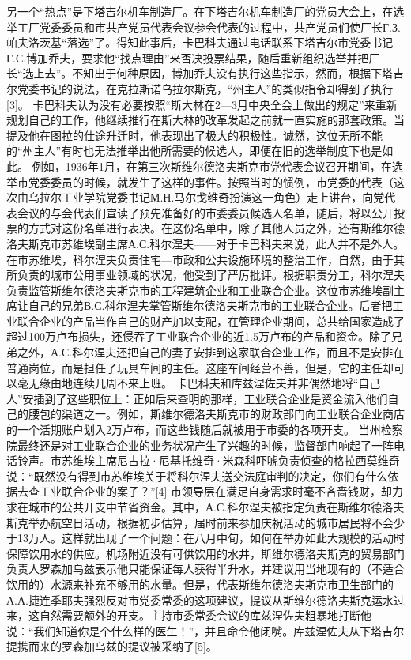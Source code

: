 另一个“热点”是下塔吉尔机车制造厂。在下塔吉尔机车制造厂的党员大会上，在选举工厂党委委员和市共产党员代表会议参会代表的过程中，共产党员们使厂长Г.З.帕夫洛茨基“落选”了。得知此事后，卡巴科夫通过电话联系下塔吉尔市党委书记Г.С.博加乔夫，要求他“找点理由”来否决投票结果，随后重新组织选举并把厂长“选上去”。不知出于何种原因，博加乔夫没有执行这些指示，然而，根据下塔吉尔党委书记的说法，在克拉斯诺乌拉尔斯克，“州主人”的类似指令却得到了执行[3]。
卡巴科夫认为没有必要按照“斯大林在2—3月中央全会上做出的规定”来重新规划自己的工作，他继续推行在斯大林的改革发起之前就一直实施的那套政策。当提及他在图拉的仕途升迁时，他表现出了极大的积极性。诚然，这位无所不能的“州主人”有时也无法推举出他所需要的候选人，即便在旧的选举制度下也是如此。
例如，1936年1月，在第三次斯维尔德洛夫斯克市党代表会议召开期间，在选举市党委委员的时候，就发生了这样的事件。按照当时的惯例，市党委的代表（这次由乌拉尔工业学院党委书记М.Н.马尔戈维奇扮演这一角色）走上讲台，向党代表会议的与会代表们宣读了预先准备好的市委委员候选人名单，随后，将以公开投票的方式对这份名单进行表决。在这份名单中，除了其他人员之外，还有斯维尔德洛夫斯克市苏维埃副主席А.С.科尔涅夫——对于卡巴科夫来说，此人并不是外人。在市苏维埃，科尔涅夫负责住宅—市政和公共设施环境的整治工作，自然，由于其所负责的城市公用事业领域的状况，他受到了严厉批评。根据职责分工，科尔涅夫负责监管斯维尔德洛夫斯克市的工程建筑企业和工业联合企业。这位市苏维埃副主席让自己的兄弟В.С.科尔涅夫掌管斯维尔德洛夫斯克市的工业联合企业。后者把工业联合企业的产品当作自己的财产加以支配，在管理企业期间，总共给国家造成了超过100万卢布损失，还侵吞了工业联合企业的近1.5万卢布的产品和资金。除了兄弟之外，А.С.科尔涅夫还把自己的妻子安排到这家联合企业工作，而且不是安排在普通岗位，而是担任了玩具车间的主任。这座车间经营不善，但是，它的主任却可以毫无缘由地连续几周不来上班。
卡巴科夫和库兹涅佐夫并非偶然地将“自己人”安插到了这些职位上：正如后来查明的那样，工业联合企业是资金流入他们自己的腰包的渠道之一。例如，斯维尔德洛夫斯克市的财政部门向工业联合企业商店的一个活期账户划入2万卢布，而这些钱随后就被用于市委的各项开支。
当州检察院最终还是对工业联合企业的业务状况产生了兴趣的时候，监督部门响起了一阵电话铃声。市苏维埃主席尼古拉·尼基托维奇·米森科吓唬负责侦查的格拉西莫维奇说：“既然没有得到市苏维埃关于将科尔涅夫送交法庭审判的决定，你们有什么依据去查工业联合企业的案子？”[4]
市领导层在满足自身需求时毫不吝啬钱财，却力求在城市的公共开支中节省资金。其中，А.С.科尔涅夫被指定负责在斯维尔德洛夫斯克举办航空日活动，根据初步估算，届时前来参加庆祝活动的城市居民将不会少于13万人。这样就出现了一个问题：在八月中旬，如何在举办如此大规模的活动时保障饮用水的供应。机场附近没有可供饮用的水井，斯维尔德洛夫斯克的贸易部门负责人罗森加乌兹表示他只能保证每人获得半升水，并建议用当地现有的（不适合饮用的）水源来补充不够用的水量。但是，代表斯维尔德洛夫斯克市卫生部门的А.А.捷连季耶夫强烈反对市党委常委的这项建议，提议从斯维尔德洛夫斯克运水过来，这自然需要额外的开支。主持市委常委会议的库兹涅佐夫粗暴地打断他说：“我们知道你是个什么样的医生！”，并且命令他闭嘴。库兹涅佐夫从下塔吉尔提携而来的罗森加乌兹的提议被采纳了[5]。
